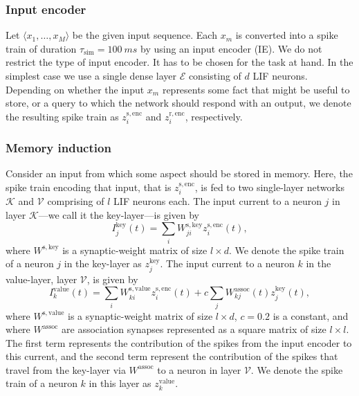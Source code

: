 \documentclass{article}
\begin{document}
\subsubsection{Input encoder}
Let $\langle x_1, \dots , x_M \rangle$ be the given input sequence. Each $x_m$ is converted into a spike train of duration $\tau_{\mathrm{sim}} = \SI{100}{ms}$ by using an input encoder (IE). We do not restrict the type of input encoder. It has to be chosen for the task at hand. In the simplest case we use a single dense layer $\mathcal{E}$ consisting of $d$ \gls{LIF} neurons.
Depending on whether the input $x_m$ represents some fact that might be useful to store, or a query to which the network should respond with an output, we denote the resulting spike train as $z_i^{\mathrm{s,enc}}$ and $z_i^{\mathrm{r,enc}}$, respectively.

\subsubsection{Memory induction}
Consider an input from which some aspect should be stored in memory. Here, the spike train encoding that input, that is $z_i^{\mathrm{s,enc}}$, is fed to two single-layer networks $\mathcal{K}$ and $\mathcal{V}$ comprising of $l$ LIF neurons each. The input current to a neuron $j$ in layer $\mathcal{K}$---we call it the key-layer---is given by
\begin{equation}
    I^{\mathrm{key}}_j(t) = \sum_i W^\mathrm{s,key}_{ji} z_i^{\mathrm{s,enc}}(t),
\end{equation}
where $W^{\mathrm{s,key}}$ is a synaptic-weight matrix of size $l \times d$. We denote the spike train of a neuron $j$ in the key-layer as $z_j^{\mathrm{key}}$. The input current to a neuron $k$ in the value-layer, layer $\mathcal{V}$, is given by
\begin{equation}
        I^{\mathrm{value}}_k(t) = \sum_i W^\mathrm{s,value}_{ki} z_i^{\mathrm{s,enc}}(t) + c \sum_j W^{\mathrm{assoc}}_{kj}(t) z_j^{\mathrm{key}}(t),
\end{equation}
where $W^{\mathrm{s,value}}$ is a synaptic-weight matrix of size $l \times d$, $c = 0.2$ is a constant, and where $W^{\mathrm{assoc}}$ are association synapses represented as a square matrix of size $l \times l$. The first term represents the contribution of the spikes from the input encoder to this current, and the second term represent the contribution of the spikes that travel from the key-layer via $W^{\mathrm{assoc}}$ to a neuron in layer $\mathcal{V}$. We denote the spike train of a neuron $k$ in this layer as $z_k^{\mathrm{value}}$.
\end{document}
